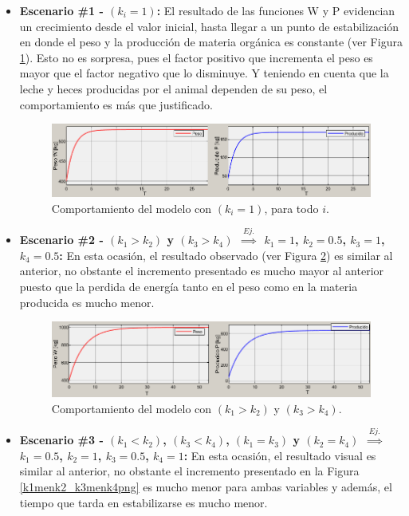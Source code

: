 \begin{itemize}
    \item \textbf{Escenario \#1 - $(k_{i}=1)$:} El resultado de las funciones W y P evidencian un crecimiento desde el valor inicial, hasta llegar a un punto de estabilización en donde el peso y la producción de materia orgánica es constante (ver Figura \ref{igualkipng}). Esto no es sorpresa, pues el factor positivo que incrementa el peso es mayor que el factor negativo que  lo disminuye. Y teniendo en cuenta que la leche y heces producidas por el animal dependen de su peso, el comportamiento es más que justificado.
    
        \begin{figure}[H]
        	 \centering
        	 \includegraphics[scale=0.75]{img/igualki.png}
        	 \caption{Comportamiento del modelo con $(k_{i}=1)$, para todo $i$. \label{igualkipng}}
        \end{figure}
    
    \item \textbf{Escenario \#2 - $(k_{1}>k_{2})$ y $(k_{3}>k_{4})$ $\overset{Ej.}{\implies}$ $k_{1}=1$, $k_{2}=0.5$, $k_{3}=1$, $k_{4}=0.5$:} En esta ocasión, el resultado observado (ver Figura \ref{k1Mk2_k3Mk4png}) es similar al anterior, no obstante el incremento presentado es mucho mayor al anterior puesto que la perdida de energía tanto en el peso como en la materia producida es mucho menor.

        \begin{figure}[H]
        	 \centering
        	 \includegraphics[scale=0.7750]{img/k1Mk2_k3Mk4.png}
        	 \caption{Comportamiento del modelo con $(k_{1}>k_{2})$ y $(k_{3}>k_{4})$. \label{k1Mk2_k3Mk4png}}
        \end{figure}
        
    \item \textbf{Escenario \#3 - $(k_{1}<k_{2})$, $(k_{3}<k_{4})$, $(k_{1}=k_{3})$ y $(k_{2}=k_{4})$ $\overset{Ej.}{\implies}$ $k_{1}=0.5$, $k_{2}=1$, $k_{3}=0.5$, $k_{4}=1$:} En esta ocasión, el resultado visual es similar al anterior, no obstante el incremento presentado en la Figura \ref{k1menk2_k3menk4png} es mucho menor  para ambas variables y además, el tiempo que tarda en estabilizarse es mucho menor.


\end{itemize}
